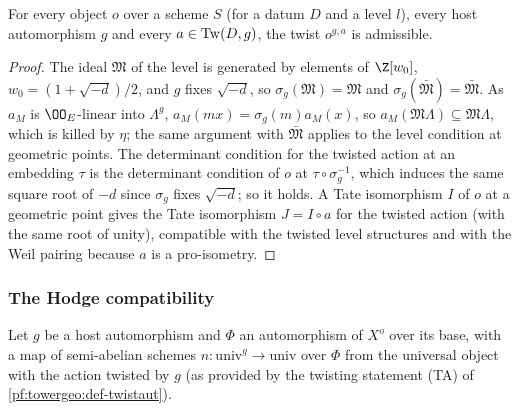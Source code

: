 \begin{proposition}\label{pf:tower:twistok}
For every object $o$ over a scheme $S$ (for a datum $D$ and a level $l$), every host automorphism $g$ and every
$a\in\mathrm{Tw}(D,g)$, the twist $o^{g,a}$ is admissible.
\end{proposition}

\begin{proof}
The ideal $\mathfrak M$ of the level is generated by elements of $\Z[w_0]$, $w_0=(1+\sqrt{-d})/2$, and $g$ fixes $\sqrt{-d}$, so
$\sigma_g(\mathfrak M)=\mathfrak M$ and $\sigma_g(\bar{\mathfrak M})=\bar{\mathfrak M}$. As $a_M$ is $\OO_E$-linear into
$\Lambda^g$, $a_M(mx)=\sigma_g(m)a_M(x)$, so $a_M(\mathfrak M\Lambda)\subseteq\mathfrak M\Lambda$, which is killed by $\eta$; the
same argument with $\bar{\mathfrak M}$ applies to the level condition at geometric points. The determinant condition for the
twisted action at an embedding $\tau$ is the determinant condition of $o$ at $\tau\circ\sigma_g^{-1}$, which induces the same
square root of $-d$ since $\sigma_g$ fixes $\sqrt{-d}$; so it holds. A Tate isomorphism $I$ of $o$ at a geometric point gives
the Tate isomorphism $J=I\circ a$ for the twisted action (with the same root of unity), compatible with the twisted level
structures and with the Weil pairing because $a$ is a pro-isometry.
\end{proof}

\subsubsection*{The Hodge compatibility}
Let $g$ be a host automorphism and $\Phi$ an automorphism of $X^o$ over its base, with a map of semi-abelian schemes
$n\colon\mathrm{univ}^g\to\mathrm{univ}$ over $\Phi$ from the universal object with the action twisted by $g$ (as provided by
the twisting statement (TA) of \cref{pf:towergeo:def-twistaut}).

